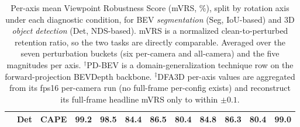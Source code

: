 \begin{table}[t]
\begin{tabular}{lll ccc ccc ccc}
 & Det & CAPE   & 99.2 & 98.5 & 84.4 & 86.5 & 80.4 & 84.8 & 86.3 & 80.4 & 99.0\\
\bottomrule
\end{tabular}
\caption{Per-axis mean Viewpoint Robustness Score (mVRS, \%), split by rotation axis under each diagnostic condition, for BEV \emph{segmentation} (Seg, IoU-based) and 3D \emph{object detection} (Det, NDS-based). mVRS is a normalized clean-to-perturbed retention ratio, so the two tasks are directly comparable. Averaged over the seven perturbation buckets (six per-camera and all-camera) and the five magnitudes per axis. $^\dagger$PD-BEV is a domain-generalization technique row on the forward-projection BEVDepth backbone. $^\ddagger$DFA3D per-axis values are aggregated from its fps16 per-camera run (no full-frame per-config exists) and reconstruct its full-frame headline mVRS only to within $\pm0.1$.}
\label{tab:supp_peraxis}
\end{table}
